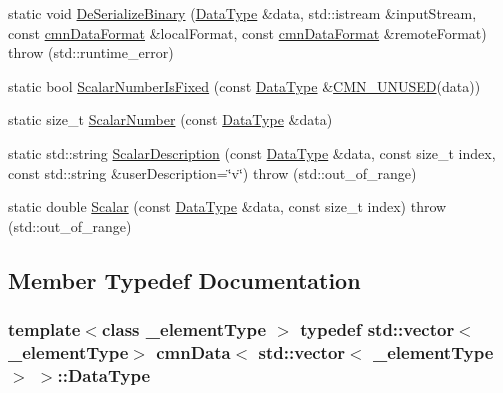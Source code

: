 \begin{DoxyCompactItemize}
\item 
static void \hyperlink{classcmn_data_3_01std_1_1vector_3_01__element_type_01_4_01_4_a36ff053a8e35de00cb0e0183d2f81673}{De\-Serialize\-Binary} (\hyperlink{classcmn_data_3_01std_1_1vector_3_01__element_type_01_4_01_4_a7a5332ebd12138b5f6d8b856cd3fdfd5}{Data\-Type} \&data, std\-::istream \&input\-Stream, const \hyperlink{classcmn_data_format}{cmn\-Data\-Format} \&local\-Format, const \hyperlink{classcmn_data_format}{cmn\-Data\-Format} \&remote\-Format)  throw (std\-::runtime\-\_\-error)
\item 
static bool \hyperlink{classcmn_data_3_01std_1_1vector_3_01__element_type_01_4_01_4_af3d6e0d0f3cffd877e9da2cc5ed45962}{Scalar\-Number\-Is\-Fixed} (const \hyperlink{classcmn_data_3_01std_1_1vector_3_01__element_type_01_4_01_4_a7a5332ebd12138b5f6d8b856cd3fdfd5}{Data\-Type} \&\hyperlink{cmn_portability_8h_a021894e2626935fa2305434b1e893ff6}{C\-M\-N\-\_\-\-U\-N\-U\-S\-E\-D}(data))
\item 
static size\-\_\-t \hyperlink{classcmn_data_3_01std_1_1vector_3_01__element_type_01_4_01_4_a9ec6f3db4445118901e9cdf2c09a510e}{Scalar\-Number} (const \hyperlink{classcmn_data_3_01std_1_1vector_3_01__element_type_01_4_01_4_a7a5332ebd12138b5f6d8b856cd3fdfd5}{Data\-Type} \&data)
\item 
static std\-::string \hyperlink{classcmn_data_3_01std_1_1vector_3_01__element_type_01_4_01_4_a7840fb40b18cd8c6427d889b03627aa2}{Scalar\-Description} (const \hyperlink{classcmn_data_3_01std_1_1vector_3_01__element_type_01_4_01_4_a7a5332ebd12138b5f6d8b856cd3fdfd5}{Data\-Type} \&data, const size\-\_\-t index, const std\-::string \&user\-Description=\char`\"{}v\char`\"{})  throw (std\-::out\-\_\-of\-\_\-range)
\item 
static double \hyperlink{classcmn_data_3_01std_1_1vector_3_01__element_type_01_4_01_4_aa83fd0fb588a1c79a88a4e94e143241b}{Scalar} (const \hyperlink{classcmn_data_3_01std_1_1vector_3_01__element_type_01_4_01_4_a7a5332ebd12138b5f6d8b856cd3fdfd5}{Data\-Type} \&data, const size\-\_\-t index)  throw (std\-::out\-\_\-of\-\_\-range)
\end{DoxyCompactItemize}


\subsection{Member Typedef Documentation}
\hypertarget{classcmn_data_3_01std_1_1vector_3_01__element_type_01_4_01_4_a7a5332ebd12138b5f6d8b856cd3fdfd5}{
\subsubsection[{Data\-Type}]{\setlength{\rightskip}{0pt plus 5cm}template$<$class \-\_\-element\-Type $>$ typedef std\-::vector$<$\-\_\-element\-Type$>$ {\bf cmn\-Data}$<$ std\-::vector$<$ \-\_\-element\-Type $>$ $>$\-::{\bf Data\-Type}}}\label{classcmn_data_3_01std_1_1vector_3_01__element_type_01_4_01_4_a7a5332ebd12138b5f6d8b856cd3fdfd5}


